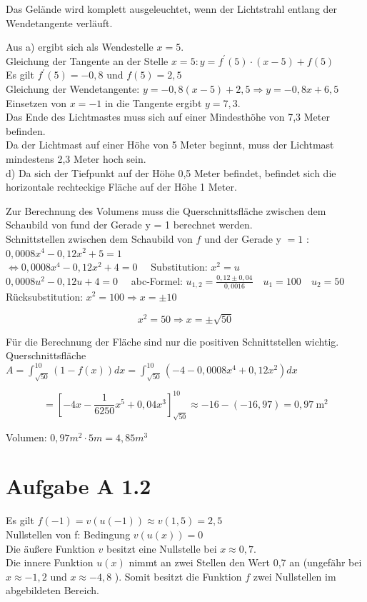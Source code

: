 \documentclass[10pt]{article}
\begin{document}
Das Gelände wird komplett ausgeleuchtet, wenn der Lichtstrahl entlang der Wendetangente verläuft.

Aus a) ergibt sich als Wendestelle $x=5$.\\
Gleichung der Tangente an der Stelle $x=5: y=f^{\prime}(5) \cdot(x-5)+f(5)$\\
Es gilt $f^{\prime}(5)=-0,8$ und $f(5)=2,5$\\
Gleichung der Wendetangente: $y=-0,8(x-5)+2,5 \Rightarrow y=-0,8 x+6,5$\\
Einsetzen von $x=-1$ in die Tangente ergibt $y=7,3$.\\
Das Ende des Lichtmastes muss sich auf einer Mindesthöhe von 7,3 Meter befinden.\\
Da der Lichtmast auf einer Höhe von 5 Meter beginnt, muss der Lichtmast mindestens 2,3 Meter hoch sein.\\
d) Da sich der Tiefpunkt auf der Höhe 0,5 Meter befindet, befindet sich die horizontale rechteckige Fläche auf der Höhe 1 Meter.

Zur Berechnung des Volumens muss die Querschnittsfläche zwischen dem Schaubild von fund der Gerade y = 1 berechnet werden.\\

Schnittstellen zwischen dem Schaubild von $f$ und der Gerade y $=1$ :\\
$0,0008 x^{4}-0,12 x^{2}+5=1$\\
$\Leftrightarrow 0,0008 x^{4}-0,12 x^{2}+4=0 \quad$ Substitution: $x^{2}=u$\\
$0,0008 u^{2}-0,12 u+4=0 \quad$ abc-Formel: $u_{1,2}=\frac{0,12 \pm 0,04}{0,0016} \quad u_{1}=100 \quad u_{2}=50$\\
Rücksubstitution: $x^{2}=100 \Rightarrow x= \pm 10$

$$
x^{2}=50 \Rightarrow x= \pm \sqrt{50}
$$

Für die Berechnung der Fläche sind nur die positiven Schnittstellen wichtig.\\
Querschnittsfläche $A=\int_{\sqrt{50}}^{10}(1-f(x)) d x=\int_{\sqrt{50}}^{10}\left(-4-0,0008 x^{4}+0,12 x^{2}\right) d x$

$$
=\left[-4 x-\frac{1}{6250} x^{5}+0,04 x^{3}\right]_{\sqrt{50}}^{10} \approx-16-(-16,97)=0,97 \mathrm{~m}^{2}
$$

Volumen: $0,97 m^{2} \cdot 5 m=4,85 m^{3}$

\section*{Aufgabe A 1.2}
Es gilt $f(-1)=v(u(-1)) \approx v(1,5)=2,5$\\
Nullstellen von f: Bedingung $v(u(x))=0$\\
Die äußere Funktion $v$ besitzt eine Nullstelle bei $x \approx 0,7$.\\
Die innere Funktion $u(x)$ nimmt an zwei Stellen den Wert 0,7 an (ungefähr bei $x \approx-1,2$ und $x \approx-4,8$ ). Somit besitzt die Funktion $f$ zwei Nullstellen im abgebildeten Bereich.
\end{document}
